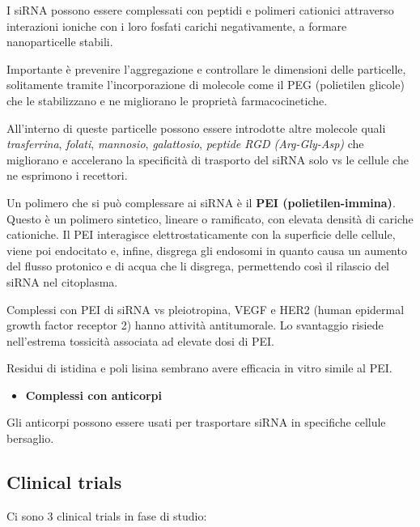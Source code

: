 \documentclass[11pt]{book}
\begin{document}
I siRNA possono essere complessati con peptidi e polimeri cationici
attraverso interazioni ioniche con i loro fosfati carichi negativamente,
a formare nanoparticelle stabili.

Importante è prevenire l'aggregazione e controllare le dimensioni delle
particelle, solitamente tramite l'incorporazione di molecole come il PEG
(polietilen glicole) che le stabilizzano e ne migliorano le proprietà
farmacocinetiche.

All'interno di queste particelle possono essere introdotte altre
molecole quali \emph{trasferrina}, \emph{folati}, \emph{mannosio},
\emph{galattosio}, \emph{peptide RGD (Arg-Gly-Asp)} che migliorano e
accelerano la specificità di trasporto del siRNA solo vs le cellule che
ne esprimono i recettori.

Un polimero che si può complessare ai siRNA è il \textbf{PEI
(polietilen-immina)}. Questo è un polimero sintetico, lineare o
ramificato, con elevata densità di cariche cationiche. Il PEI
interagisce elettrostaticamente con la superficie delle cellule, viene
poi endocitato e, infine, disgrega gli endosomi in quanto causa un
aumento del flusso protonico e di acqua che li disgrega, permettendo
così il rilascio del siRNA nel citoplasma.

Complessi con PEI di siRNA vs pleiotropina, VEGF e HER2 (human epidermal
growth factor receptor 2) hanno attività antitumorale. Lo svantaggio
risiede nell'estrema tossicità associata ad elevate dosi di PEI.

Residui di istidina e poli lisina sembrano avere efficacia in vitro
simile al PEI.

\begin{itemize}
\itemsep1pt\parskip0pt
\item
  \textbf{Complessi con anticorpi}
\end{itemize}

Gli anticorpi possono essere usati per trasportare siRNA in specifiche
cellule bersaglio.

\subsection{Clinical trials}\label{clinical-trials}

Ci sono 3 clinical trials in fase di studio:
\end{document}
